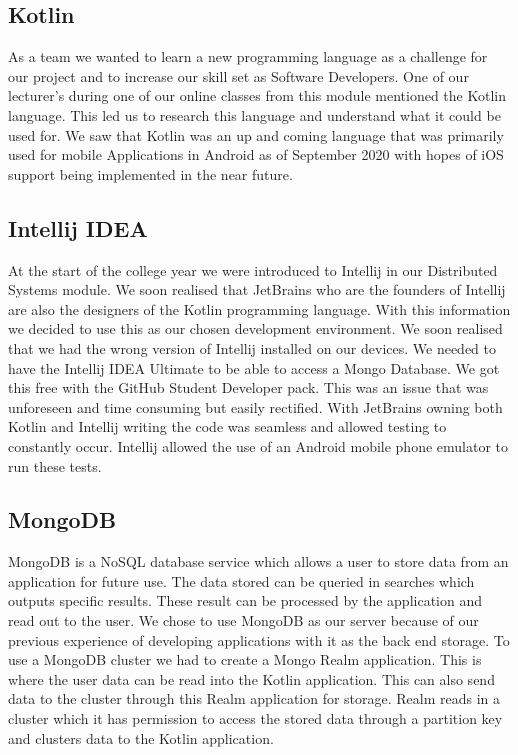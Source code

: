 \subsection{Kotlin}
As a team we wanted to learn a new programming language as a challenge for our project and to increase our skill set as Software Developers. One of our lecturer's during one of our online classes from this module mentioned the Kotlin language. This led us to research this language and understand what it could be used for. We saw that Kotlin was an up and coming language that was primarily used for mobile Applications in Android as of September 2020 with hopes of iOS support being implemented in the near future.
\subsection{Intellij IDEA}
At the start of the college year we were introduced to Intellij in our Distributed Systems module. We soon realised that JetBrains who are the founders of Intellij are also the designers of the Kotlin programming language. With this information we decided to use this as our chosen development environment.
We soon realised that we had the wrong version of Intellij installed on our devices. We needed to have the Intellij IDEA Ultimate to be able to access a Mongo Database. We got this free with the GitHub Student Developer pack. This was an issue that was unforeseen and time consuming but easily rectified.
With JetBrains owning both Kotlin and Intellij writing the code was seamless and allowed testing to constantly occur. Intellij allowed the use of an Android mobile phone emulator to run these tests.
\subsection{MongoDB}
MongoDB is a NoSQL database service which allows a user to store data from an application for future use. The data stored can be queried in searches which outputs specific results. These result can be processed by the application and read out to the user. We chose to use MongoDB as our server because of our previous experience of developing applications with it as the back end storage.
\newline
\newline
To use a MongoDB cluster we had to create a Mongo Realm application. This is where the user data can be read into the Kotlin application.
This can also send data to the cluster through this Realm application for storage. Realm reads in a cluster which it has permission to access the stored data through a partition key and clusters data to the Kotlin application.

